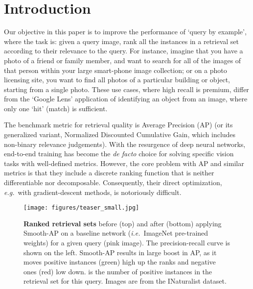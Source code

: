 \documentclass[runningheads]{llncs}
\providecommand{\ie}[0]{\emph{i.e.}}
\providecommand{\eg}[0]{\emph{e.g.}}
\begin{document}
\section{Introduction}
Our objective in this paper is to improve the performance of 
`query by example', where the task is:
given a query image, rank all the instances in a retrieval set according to their relevance to the query. For instance, imagine that you have a photo of a friend or family member, and want
to search for all of the images of that person within your large
smart-phone image collection; or on a photo licensing site, you want
to find all photos of a particular building or object, starting from a
single photo. These use cases, where high recall is premium, differ
from the `Google Lens' application of identifying an object from an
image, where only one `hit' (match) is sufficient. 

The benchmark metric for retrieval quality is Average Precision (AP) (or its generalized variant, Normalized Discounted Cumulative Gain, which includes non-binary relevance judgements).  
With the resurgence of deep neural networks, 
end-to-end training has become the \emph{de facto} choice for solving specific vision tasks with well-defined metrics. 
However, the core problem with AP and similar metrics is that they include a discrete ranking function that
is neither differentiable nor decomposable. 
Consequently, their direct optimization, \eg\ with gradient-descent methods, 
is notoriously difficult. 

\begin{figure}[t!]
\begin{center}
   \texttt{[image: figures/teaser\_small.jpg]}
\end{center}

\caption{\small{
\textbf{Ranked retrieval sets} before (top) and after (bottom) applying Smooth-AP on a baseline network (\ie\ ImageNet pre-trained weights) for a given query (pink image). 
The precision-recall curve is shown on the left. Smooth-AP results in large boost in AP, as it moves positive instances (green) high up the ranks and negative ones (red) low down.  is the number of positive instances in the retrieval set for this query. Images are from the INaturalist dataset.
}}

\label{fig:teaser}

\end{figure}
\end{document}
